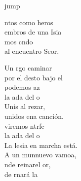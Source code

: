 \begin{cancion}jump\\
	\begin{chorus}%
		ntos como heros\\
		embros de una Isia\\
		mos cndo\\
		al encuentro  Seor.\jump\\
	\end{chorus}%
	Un rgo caminar\\
	por el desto bajo el \\
	 podemos az\\
	 la ada del o \\
	\jump
	Unis al rezar,\\
	unidos ena canción. \\
	viremos ntrfe\\
	 la ada del o \\
	\jump
	La lesia en marcha está.\\
	A un munnuevo vamoa,\\
	nde reinarel or,\\
	de rnará la\\
\end{cancion}%
